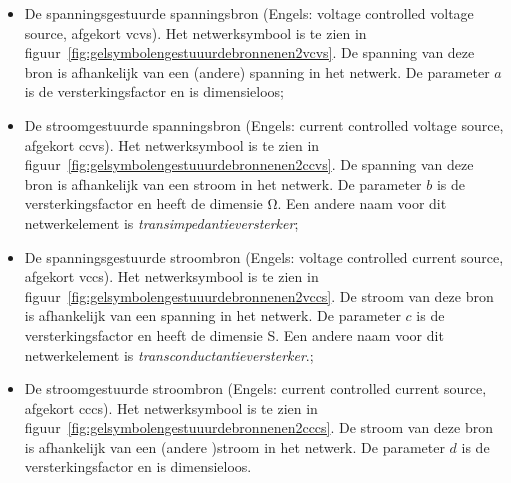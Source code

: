 \begin{itemize}
\item De spanningsgestuurde spanningsbron (Engels: voltage controlled voltage source, afgekort vcvs). Het netwerksymbool is te zien in figuur~\ref{fig:gelsymbolengestuuurdebronnenen2vcvs}. De spanning van deze bron is afhankelijk van een (andere) spanning in het netwerk. De parameter $a$ is de versterkingsfactor en is dimensieloos;
\item De stroomgestuurde spanningsbron (Engels: current controlled voltage source, afgekort ccvs). Het netwerksymbool is te zien in figuur~\ref{fig:gelsymbolengestuuurdebronnenen2ccvs}. De spanning van deze bron is afhankelijk van een stroom in het netwerk. De parameter $b$ is de versterkingsfactor en heeft de dimensie \si{\ohm}. Een andere naam voor dit netwerkelement is \textsl{transimpedantieversterker};
\item De spanningsgestuurde stroombron (Engels: voltage controlled current source, afgekort vccs). Het netwerksymbool is te zien in figuur~\ref{fig:gelsymbolengestuuurdebronnenen2vccs}. De stroom van deze bron is afhankelijk van een spanning in het netwerk. De parameter $c$ is de versterkingsfactor en heeft de dimensie \si{\siemens}. Een andere naam voor dit netwerkelement is \textsl{transconductantieversterker}.;
\item De stroomgestuurde stroombron (Engels: current controlled current source, afgekort cccs). Het netwerksymbool is te zien in figuur~\ref{fig:gelsymbolengestuuurdebronnenen2cccs}. De stroom van deze bron is afhankelijk van een (andere )stroom in het netwerk. De parameter $d$ is de versterkingsfactor en is dimensieloos.
\end{itemize}

